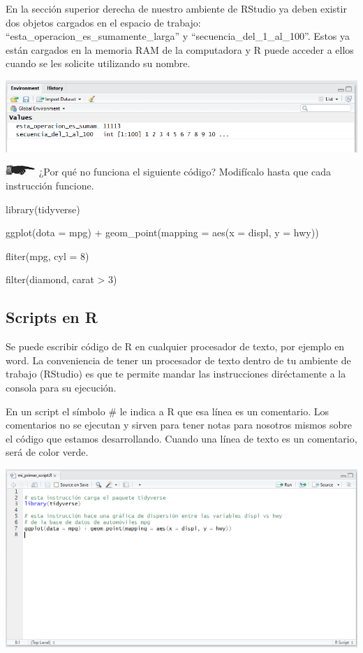 \documentclass[]{book}
\theoremstyle{definition}
\theoremstyle{definition}
\theoremstyle{definition}
\theoremstyle{remark}
\begin{document}
En la sección superior derecha de nuestro ambiente de RStudio ya deben
existir dos objetos cargados en el espacio de trabajo:
``esta\_operacion\_es\_sumamente\_larga'' y
``secuencia\_del\_1\_al\_100''. Estos ya están cargados en la memoria
RAM de la computadora y R puede acceder a ellos cuando se les solicite
utilizando su nombre.

\includegraphics[width=12.53in]{./imagenes/3_espacio_trabajo}

\includegraphics{./imagenes/manicule2.jpg} ¿Por qué no funciona el
siguiente código? Modifícalo hasta que cada instrucción funcione.

library(tidyverse)

ggplot(dota = mpg) + geom\_point(mapping = aes(x = displ, y = hwy))

fliter(mpg, cyl = 8)

filter(diamond, carat \textgreater{} 3)

\subsection{Scripts en R}\label{scripts-en-r}

Se puede escribir código de R en cualquier procesador de texto, por
ejemplo en word. La conveniencia de tener un procesador de texto dentro
de tu ambiente de trabajo (RStudio) es que te permite mandar las
instrucciones diréctamente a la consola para su ejecución.

En un script el símbolo \# le indica a R que esa línea es un comentario.
Los comentarios no se ejecutan y sirven para tener notas para nosotros
mismos sobre el código que estamos desarrollando. Cuando una línea de
texto es un comentario, será de color verde.

\includegraphics[width=14in]{./imagenes/4_primer_script}
\end{document}
